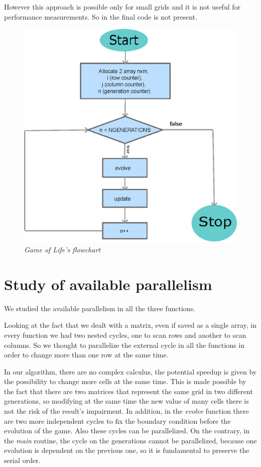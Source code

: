 \documentclass[a4paper,11pt,twoside]{report}
\begin{document}
\noindent However this approach is possible only for small grids and it is not useful for performance measurements. So in the final code is not present.
\begin{figure}
	\centering
	\includegraphics[scale = 0.8]{chart.eps}
	\caption{\emph{Game of Life's flowchart}}\label{fig:1}
\end{figure}

\chapter{Study of available parallelism}

\noindent We studied the available parallelism in all the three functions.

\noindent Looking at the fact that we dealt with a matrix, even if saved as a single array, in every function we had two nested cycles, one to scan rows and another to scan columns. So we thought to parallelize the external cycle in all the functions in order to change more than one row at the same time.

\noindent In our algorithm, there are no complex calculus, the potential speedup is given by the possibility to change more cells at the same time. This is made possible by the fact that there are two matrices that represent the same grid in two different generations, so modifying at the same time the new value of many cells there is not the risk of the result's impairment.
In addition, in the \emph{evolve} function there are two more independent cycles to fix the boundary condition before the evolution of the game. Also these cycles can be parallelized. 
On the contrary, in the \emph{main} routine, the cycle on the generations cannot be parallelized, because one evolution is dependent on the previous one, so it is fundamental to preserve the serial order. 
\end{document}
